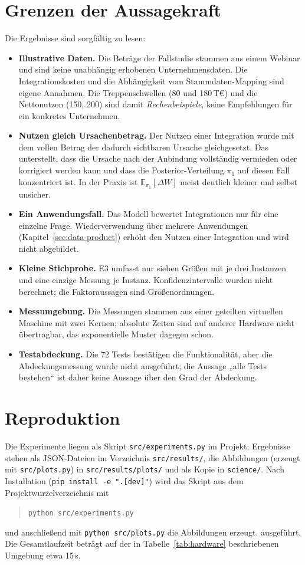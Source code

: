 \documentclass[a4paper,12pt,twoside]{report}
\theoremstyle{definition}
\newcommand{\E}{\mathbb{E}}
\begin{document}
\section{Grenzen der Aussagekraft}
\label{sec:exp-grenzen}
Die Ergebnisse sind sorgfältig zu lesen:
\begin{itemize}
\item \textbf{Illustrative Daten.} Die Beträge der Fallstudie stammen aus einem Webinar und sind keine unabhängig erhobenen Unternehmensdaten. Die Integrationskosten und die Abhängigkeit vom Stammdaten-Mapping sind eigene Annahmen. Die Treppenschwellen (80 und 180\,T€) und die Nettonutzen (150, 200) sind damit \emph{Rechenbeispiele}, keine Empfehlungen für ein konkretes Unternehmen.
\item \textbf{Nutzen gleich Ursachenbetrag.} Der Nutzen einer Integration wurde mit dem vollen Betrag der dadurch sichtbaren Ursache gleichgesetzt. Das unterstellt, dass die Ursache nach der Anbindung vollständig vermieden oder korrigiert werden kann und dass die Posterior-Verteilung $\pi_1$ auf diesen Fall konzentriert ist. In der Praxis ist $\E_{\pi_1}[\Delta W]$ meist deutlich kleiner und selbst unsicher.
\item \textbf{Ein Anwendungsfall.} Das Modell bewertet Integrationen nur für eine einzelne Frage. Wiederverwendung über mehrere Anwendungen (Kapitel~\ref{sec:data-product}) erhöht den Nutzen einer Integration und wird nicht abgebildet.
\item \textbf{Kleine Stichprobe.} E3 umfasst nur sieben Größen mit je drei Instanzen und eine einzige Messung je Instanz. Konfidenzintervalle wurden nicht berechnet; die Faktoraussagen sind Größenordnungen.
\item \textbf{Messumgebung.} Die Messungen stammen aus einer geteilten virtuellen Maschine mit zwei Kernen; absolute Zeiten sind auf anderer Hardware nicht übertragbar, das exponentielle Muster dagegen schon.
\item \textbf{Testabdeckung.} Die 72 Tests bestätigen die Funktionalität, aber die Abdeckungsmessung wurde nicht ausgeführt; die Aussage „alle Tests bestehen“ ist daher keine Aussage über den Grad der Abdeckung.
\end{itemize}

\section{Reproduktion}
Die Experimente liegen als Skript \texttt{src/experiments.py} im Projekt; Ergebnisse stehen als JSON-Dateien im Verzeichnis \texttt{src/results/}, die Abbildungen (erzeugt mit \texttt{src/plots.py}) in \texttt{src/results/plots/} und als Kopie in \texttt{science/}. Nach Installation (\texttt{pip install -e ".[dev]"}) wird das Skript aus dem Projektwurzelverzeichnis mit
\begin{quote}
\texttt{python src/experiments.py}
\end{quote}
und anschließend mit \texttt{python src/plots.py} die Abbildungen erzeugt.
ausgeführt. Die Gesamtlaufzeit beträgt auf der in Tabelle~\ref{tab:hardware} beschriebenen Umgebung etwa 15\,s.
\end{document}
